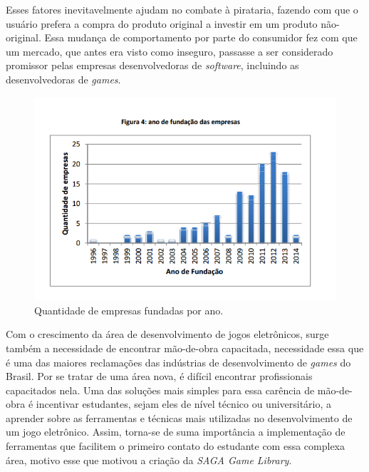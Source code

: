 Esses fatores inevitavelmente ajudam no combate à pirataria, fazendo com que o usuário prefera a compra do produto original a investir em um produto não-original. Essa mudança de comportamento por parte do consumidor fez com que um mercado, que antes era visto como inseguro, passasse a ser considerado promissor pelas empresas desenvolvedoras de \textit{software}, incluindo as desenvolvedoras de \textit{games}.
%
%
%
\begin{figure}[h]
    \centering
		\caption{Quantidade de empresas fundadas por ano.\cite{GEDIGames}}
    \label{AnoFundacaoEmpresas}
    \includegraphics[scale = 0.80]{Imagens/AnoFundacaoEmpresas.png}
\end{figure}
%
%
%
\par
Com o crescimento da área de desenvolvimento de jogos eletrônicos, surge também a necessidade de encontrar mão-de-obra capacitada, necessidade essa que é uma das maiores reclamações das indústrias de desenvolvimento de \textit{games} do Brasil. Por se tratar de uma área nova, é difícil encontrar profissionais capacitados nela. Uma das soluções mais simples para essa carência de mão-de-obra é incentivar estudantes, sejam eles de nível técnico ou universitário, a aprender sobre as ferramentas e técnicas mais utilizadas no desenvolvimento de um jogo eletrônico. Assim, torna-se de suma importância a implementação de ferramentas que facilitem o primeiro contato do estudante com essa complexa área, motivo esse que motivou a criação da \textit{SAGA Game Library}.
%
%
